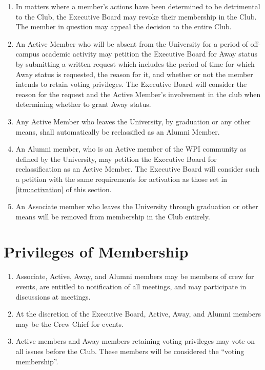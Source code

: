 \documentclass[12pt,letterpaper]{book}
\begin{document}
\begin{enumerate}
\item \label{itm:expulsion} In matters where a member's actions have been determined to be detrimental to the Club, the Executive Board may revoke their membership in the Club.  The member in question may appeal the decision to the entire Club.
\item \label{itm:awaystatus} An Active Member who will be absent from the University for a period of off-campus academic activity may petition the Executive Board for Away status by submitting a written request which includes the period of time for which Away status is requested, the reason for it, and whether or not the member intends to retain voting privileges. The Executive Board will consider the reason for the request and the Active Member’s involvement in the club when determining whether to grant Away status.
\item \label{itm:alumnistatus} Any Active Member who leaves the University, by graduation or any other means, shall automatically be reclassified as an Alumni Member.
\item \label{itm:reactivation} An Alumni member, who is an Active member of the WPI community as defined by the University, may petition the Executive Board for reclassification as an Active Member. The Executive Board will consider such a petition with the same requirements for activation as those set in \cref{itm:activation} of this section.
\item \label{itm:associategraduation} An Associate member who leaves the University through graduation or other means will be removed from membership in the Club entirely.

\end{enumerate}

\section{Privileges of Membership}

\begin{enumerate}

\item Associate, Active, Away, and Alumni members may be members of crew for events, are entitled to notification of all meetings, and may participate in discussions at meetings.
\item At the discretion of the Executive Board, Active, Away, and Alumni members may be the Crew Chief for events.
\item Active members and Away members retaining voting privileges may vote on all issues before the Club. These members will be considered the “voting membership”.

\end{enumerate}
\end{document}
